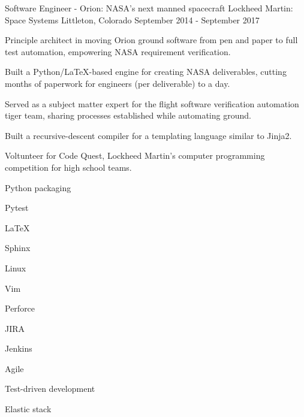 \begin{cventries}
  \cventry%
    {Software Engineer \-- Orion: NASA's next manned spacecraft} %
    {Lockheed Martin: Space Systems} %
    {Littleton, Colorado} %
    {September 2014 \-- September 2017} %
    {%
      \begin{cvitems} %
        \item {Principle architect in moving Orion ground software from pen and paper to full test automation, empowering NASA requirement verification.}
        \item {Built a Python/LaTeX-based engine for creating NASA deliverables, cutting months of paperwork for engineers (per deliverable) to a day.}
        \item {Served as a subject matter expert for the flight software verification automation tiger team, sharing processes established while automating ground.}
        \item {Built a recursive-descent compiler for a templating language similar to Jinja2.}
        \item {Voltunteer for Code Quest, Lockheed Martin's computer programming competition for high school teams.}
      \end{cvitems}
    }
    \begin{cventryskills}
      \item Python packaging
      \item Pytest
      \item LaTeX
      \item Sphinx
      \item Linux
      \item Vim
      \item Perforce
      \item JIRA
      \item Jenkins
      \item Agile
      \item Test-driven development
      \item Elastic stack
    \end{cventryskills}


\end{cventries}
